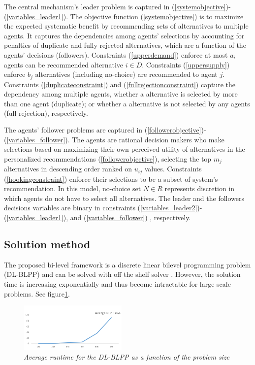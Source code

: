 \documentclass[11pt, letterpaper]{article}
\begin{document}
The central mechanism's leader problem is captured in (\ref{systemobjective})-(\ref{variables_leader1}).
The objective function (\ref{systemobjective}) is to maximize the expected systematic benefit by recommending sets of alternatives to multiple agents.  It captures the dependencies among agents' selections by accounting for penalties of duplicate and fully rejected alternatives, which are a function of the agents' decisions (followers).  
Constraints (\ref{upperdemand}) enforce at most $a_i$ agents can be recommended alternative $i \in D$.  Constraints (\ref{uppersupply}) enforce $b_j$  alternatives (including no-choice) are recommended to agent $j$.  Constraints  (\ref{duplicateconstraint}) and (\ref{fullrejectionconstraint}) capture the dependency among multiple agents, whether a alternative is selected by more than one agent (duplicate); or whether a alternative is not selected by any agents (full rejection), respectively.   


The agents' follower problems are captured in (\ref{followerobjective})-(\ref{variables_follower}). The agents are rational decision makers who make selections based on maximizing their own perceived utility of alternatives in the personalized recommendations (\ref{followerobjective}), selecting the top $m_j$ alternatives in descending order ranked on $u_{ij}$ values. Constraints (\ref{hookingconstraint}) enforce their selections to be a subset of system's recommendation. 
In this model, no-choice set $N \in R$ represents discretion in which agents do not have to select all alternatives.   
The leader and the followers decisions variables are binary in constraints (\ref{variables_leader2})-(\ref{variables_leader1}), and (\ref{variables_follower}) , respectively. 

\subsection{Solution method}
The proposed bi-level framework is a discrete linear bilevel programming problem (DL-BLPP) and can be solved with off the shelf solver \cite{bard2013practical}. However, the solution time is increasing exponentially and thus become intractable for large scale problems. See figure\ref{fig:runtime1}.
\begin{figure}
	\centering
	\includegraphics[width=0.47\textwidth]{runtime_pic.png}
	\caption{\emph{Average runtime for the  DL-BLPP as a function of the problem size}}   \label{fig:runtime1}
\end{figure}  
\noindent
\end{document}
